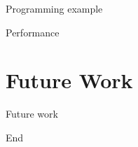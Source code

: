 \documentclass[xcolor=dvipsnames]{beamer}
\begin{document}
%

\begin{frame}{} 
  Programming example 
\end{frame} 

\begin{frame}{} 

  Performance
\end{frame} 



%
\section{Future Work}
\begin{frame}{Future work} 

\end{frame} 

\begin{frame}{}
  End
\end{frame} 
\end{document}
